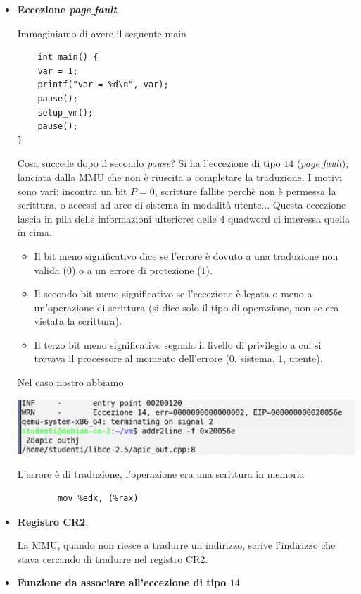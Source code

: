 \documentclass[11pt]{report}
\theoremstyle{definition}
\begin{document}
\begin{itemize}
	\item \textbf{Eccezione \emph{page$\_$fault}}. 
	
	Immaginiamo di avere il seguente main
	\begin{verbatim} 
	int main() {
    var = 1;
    printf("var = %d\n", var);
    pause();
    setup_vm();
    pause();
}			
	\end{verbatim} 
Cosa succede dopo il secondo \emph{pause}? Si ha l'eccezione di tipo $14$ (\emph{page$\_$fault}), lanciata dalla MMU che non è riuscita a completare la traduzione. I motivi sono vari: incontra un bit $P=0$, scritture fallite perchè non è permessa la scrittura, o accessi ad aree di sistema in modalità utente...  Questa eccezione lascia in pila delle informazioni ulteriore: delle 4 quadword ci interessa quella in cima.
	\begin{itemize}
		\item Il bit meno significativo dice se l'errore è dovuto a una traduzione non valida ($0$) o a un errore di protezione ($1$).
		\item Il secondo bit meno significativo se l'eccezione è legata o meno a un'operazione di scrittura (si dice solo il tipo di operazione, non se era vietata la scrittura).
		\item Il terzo bit meno significativo segnala il livello di privilegio a cui si trovava il processore al momento dell'errore ($0$, sistema, $1$, utente). 
	\end{itemize} 
	Nel caso nostro abbiamo 
	
	\begin{center}
		\includegraphics[scale=.8]{img/229.PNG}
	\end{center}
	L'errore è di traduzione, l'operazione era una scrittura in memoria
	\begin{verbatim}
		mov %edx, (%rax)
	\end{verbatim}
	\item \textbf{Registro CR2}.
	
	La MMU, quando non riesce a tradurre un indirizzo, scrive l'indirizzo che stava cercando di tradurre nel registro CR2.
	
	\item \textbf{Funzione da associare all'eccezione di tipo $14$}.
	

\end{itemize}
\end{document}
